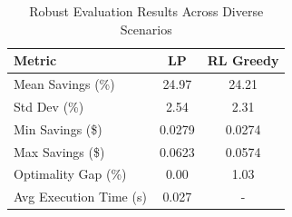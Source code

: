 \begin{table}[h]
\centering
\caption{Robust Evaluation Results Across Diverse Scenarios}
\label{tab:robust_eval}
\begin{tabular}{lcc}
\hline
\textbf{Metric} & \textbf{LP} & \textbf{RL Greedy} \\
\hline
Mean Savings (\%) & 24.97 & 24.21 \\
Std Dev (\%) & 2.54 & 2.31 \\
Min Savings (\$) & 0.0279 & 0.0274 \\
Max Savings (\$) & 0.0623 & 0.0574 \\
Optimality Gap (\%) & 0.00 & 1.03 \\
Avg Execution Time (s) & 0.027 & - \\
\hline
\end{tabular}
\end{table}
